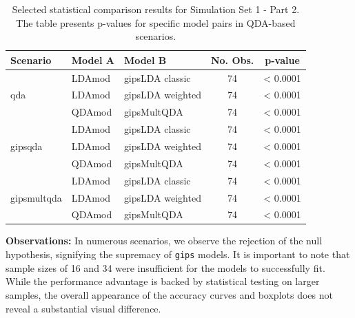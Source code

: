 \documentclass[a4paper,11pt,twoside]{report}
\theoremstyle{definition}
\begin{document}
\begin{table}[H]
    \centering
    \setlength{\tabcolsep}{4pt}
    \small
    \begin{tabular}{lllc c}
    \toprule
    \textbf{Scenario} & \textbf{Model A} & \textbf{Model B} & \textbf{No. Obs.} & \textbf{p-value} \\
    \midrule
    \multirow{3}{*}{qda}
      & \multirow{1}{*}{LDAmod} & \multirow{1}{*}{gipsLDA classic} & 74 & < 0.0001 \\
      \cmidrule{2-5}
      & \multirow{1}{*}{LDAmod} & \multirow{1}{*}{gipsLDA weighted} & 74 & < 0.0001 \\
      \cmidrule{2-5}
      & QDAmod & gipsMultQDA & 74 & < 0.0001 \\
    \midrule
    \multirow{3}{*}{gipsqda}
      & \multirow{1}{*}{LDAmod} & \multirow{1}{*}{gipsLDA classic} & 74 & < 0.0001 \\
      \cmidrule{2-5}
      & \multirow{1}{*}{LDAmod} & \multirow{1}{*}{gipsLDA weighted} & 74 & < 0.0001 \\
      \cmidrule{2-5}
      & QDAmod & gipsMultQDA & 74 & < 0.0001 \\
    \midrule
    \multirow{3}{*}{gipsmultqda}
      & \multirow{1}{*}{LDAmod} & \multirow{1}{*}{gipsLDA classic} & 74 & < 0.0001 \\
      \cmidrule{2-5}
      & \multirow{1}{*}{LDAmod} & \multirow{1}{*}{gipsLDA weighted} & 74 & < 0.0001 \\
      \cmidrule{2-5}
      & QDAmod & gipsMultQDA & 74 & < 0.0001 \\
    \bottomrule
    \end{tabular}
    \caption{Selected statistical comparison results for Simulation Set 1 - Part 2. The table presents p-values for specific model pairs in QDA-based scenarios.}
    \label{tab:stat_sim_1_part1}
\end{table}

\textbf{Observations:}
In numerous scenarios, we observe the rejection of the null hypothesis, signifying the supremacy of \texttt{gips} models.
It is important to note that sample sizes of 16 and 34 were insufficient for the models to successfully fit.
While the performance advantage is backed by statistical testing on larger samples, the overall appearance of the accuracy curves and boxplots does not reveal a substantial visual difference.
\end{document}
